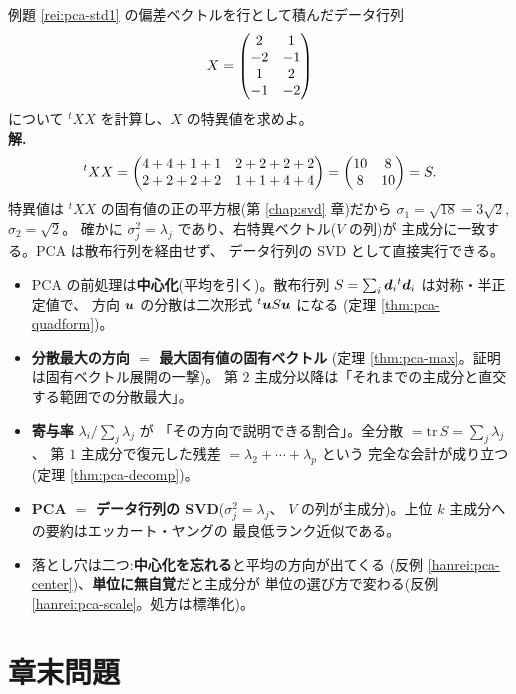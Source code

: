 \begin{rei}\label{rei:pca-std3}
例題 \ref{rei:pca-std1} の偏差ベクトルを行として積んだデータ行列
\[
X = \begin{pmatrix}2 & 1 \\ -2 & -1 \\ 1 & 2 \\ -1 & -2\end{pmatrix}
\]
について ${}^tXX$ を計算し、$X$ の特異値を求めよ。\\
\textbf{解.}\
\[
{}^tXX = \begin{pmatrix}4 + 4 + 1 + 1 & 2 + 2 + 2 + 2 \\
2 + 2 + 2 + 2 & 1 + 1 + 4 + 4\end{pmatrix} = \begin{pmatrix}10 & 8 \\ 8 & 10\end{pmatrix} = S.
\]
特異値は ${}^tXX$ の固有値の正の平方根(第 \ref{chap:svd} 章)だから
$\sigma_1 = \sqrt{18} = 3\sqrt{2}$, $\sigma_2 = \sqrt{2}$。
確かに $\sigma_j^2 = \lambda_j$ であり、右特異ベクトル($V$ の列)が
主成分に一致する。PCA は散布行列を経由せず、
データ行列の SVD として直接実行できる。
\end{rei}

\begin{matome}
\begin{itemize}
\item PCA の前処理は\textbf{中心化}(平均を引く)。散布行列
$S = \sum_i \bm{d}_i{}^t\bm{d}_i$ は対称・半正定値で、
方向 $\bm{u}$ の分散は二次形式 ${}^t\bm{u}S\bm{u}$ になる
(定理 \ref{thm:pca-quadform})。
\item \textbf{分散最大の方向 $=$ 最大固有値の固有ベクトル}
(定理 \ref{thm:pca-max}。証明は固有ベクトル展開の一撃)。
第 $2$ 主成分以降は「それまでの主成分と直交する範囲での分散最大」。
\item \textbf{寄与率} $\lambda_i / \sum_j \lambda_j$ が
「その方向で説明できる割合」。全分散 $= \mathrm{tr}\,S = \sum_j\lambda_j$、
第 $1$ 主成分で復元した残差 $= \lambda_2 + \cdots + \lambda_p$ という
完全な会計が成り立つ(定理 \ref{thm:pca-decomp})。
\item \textbf{PCA $=$ データ行列の SVD}($\sigma_j^2 = \lambda_j$、
$V$ の列が主成分)。上位 $k$ 主成分への要約はエッカート・ヤングの
最良低ランク近似である。
\item 落とし穴は二つ:\textbf{中心化を忘れる}と平均の方向が出てくる
(反例 \ref{hanrei:pca-center})、\textbf{単位に無自覚}だと主成分が
単位の選び方で変わる(反例 \ref{hanrei:pca-scale}。処方は標準化)。
\end{itemize}
\end{matome}

\section*{章末問題}

